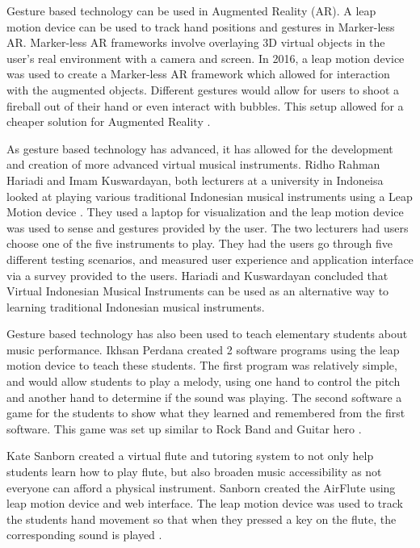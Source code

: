 \documentclass[sigconf,authordraft]{acmart}
\begin{document}
Gesture based technology can be used in Augmented Reality (AR).  A leap motion device can be used to track hand positions and gestures in Marker-less AR.  Marker-less AR frameworks involve overlaying 3D virtual objects in the user's real environment with a camera and screen.  In 2016, a leap motion device was used to create a Marker-less AR framework which allowed for interaction with the augmented objects.  Different gestures would allow for users to shoot a fireball out of their hand or even interact with bubbles.  This setup allowed for a cheaper solution for Augmented Reality \cite{Zhao}.

As gesture based technology has advanced, it has allowed for the development and creation of more advanced virtual musical instruments.  Ridho Rahman Hariadi and Imam Kuswardayan, both lecturers at a university in Indoneisa looked at playing various traditional Indonesian musical instruments using a Leap Motion device \cite{Hariadi}.  They used a laptop for visualization and the leap motion device was used to sense and gestures provided by the user.  The two lecturers had users choose one of the five instruments to play.  They had the users go through five different testing scenarios, and measured user experience and application interface via a survey provided to the users.  Hariadi and Kuswardayan concluded that Virtual Indonesian Musical Instruments can be used as an alternative way to learning traditional Indonesian musical instruments.

Gesture based technology has also been used to teach elementary students about music performance.  Ikhsan Perdana created 2 software programs using the leap motion device to teach these students.  The first program was relatively simple, and would allow students to play a melody, using one hand to control the pitch and another hand to determine if the sound was playing.  The second software a game for the students to show what they learned and remembered from the first software.  This game was set up similar to Rock Band and Guitar hero \cite{Perdana}.  

Kate Sanborn created a virtual flute and tutoring system to not only help students learn how to play flute, but also broaden music accessibility as not everyone can afford a physical instrument.  Sanborn created the AirFlute using leap motion device and web interface.  The leap motion device was used to track the students hand movement so that when they pressed a key on the flute, the corresponding sound is played \cite{Sanborn}.
\end{document}
